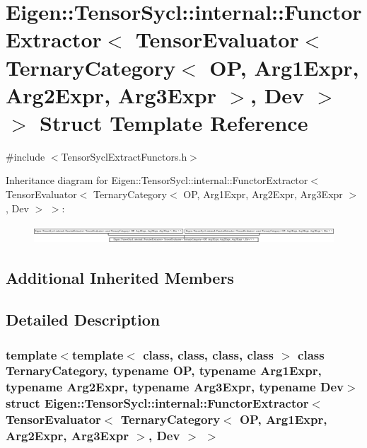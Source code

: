 \hypertarget{struct_eigen_1_1_tensor_sycl_1_1internal_1_1_functor_extractor_3_01_tensor_evaluator_3_01_ternar809ac865e821d3c7c11f9cca9cc0a9e8}{}\section{Eigen\+:\+:Tensor\+Sycl\+:\+:internal\+:\+:Functor\+Extractor$<$ Tensor\+Evaluator$<$ Ternary\+Category$<$ OP, Arg1\+Expr, Arg2\+Expr, Arg3\+Expr $>$, Dev $>$ $>$ Struct Template Reference}
\label{struct_eigen_1_1_tensor_sycl_1_1internal_1_1_functor_extractor_3_01_tensor_evaluator_3_01_ternar809ac865e821d3c7c11f9cca9cc0a9e8}


{\ttfamily \#include $<$Tensor\+Sycl\+Extract\+Functors.\+h$>$}

Inheritance diagram for Eigen\+:\+:Tensor\+Sycl\+:\+:internal\+:\+:Functor\+Extractor$<$ Tensor\+Evaluator$<$ Ternary\+Category$<$ OP, Arg1\+Expr, Arg2\+Expr, Arg3\+Expr $>$, Dev $>$ $>$\+:\begin{figure}[H]
\begin{center}
\leavevmode
\includegraphics[height=0.693928cm]{struct_eigen_1_1_tensor_sycl_1_1internal_1_1_functor_extractor_3_01_tensor_evaluator_3_01_ternar809ac865e821d3c7c11f9cca9cc0a9e8}
\end{center}
\end{figure}
\subsection*{Additional Inherited Members}


\subsection{Detailed Description}
\subsubsection*{template$<$template$<$ class, class, class, class $>$ class Ternary\+Category, typename OP, typename Arg1\+Expr, typename Arg2\+Expr, typename Arg3\+Expr, typename Dev$>$\newline
struct Eigen\+::\+Tensor\+Sycl\+::internal\+::\+Functor\+Extractor$<$ Tensor\+Evaluator$<$ Ternary\+Category$<$ O\+P, Arg1\+Expr, Arg2\+Expr, Arg3\+Expr $>$, Dev $>$ $>$}

